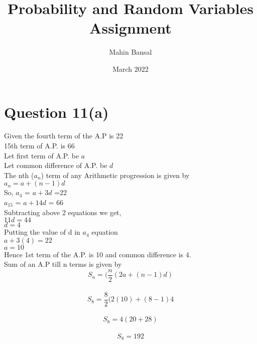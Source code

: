 \documentclass{article}
\title{Probability and Random Variables Assignment}
\author{Mahin Bansal }
\date{March 2022}
\begin{document}
\maketitle

\section{Question 11(a)}
Given the fourth term of the A.P is 22\\
15th term of A.P. is 66\\
Let first term of A.P. be $a$\\
Let common difference of A.P. be $d$\\
The nth ($a_n$) term  of any Arithmetic progression is given by 
\\$a_n = a +(n-1)d$\\
So,
$a_4$ = $a+3d$ =22\\
$a_15$ = $a+14d$ = 66\\
Subtracting above 2 equations we get,\\
$11d = 44$\\
$d=4$\\
Putting the value of d in $a_4$ equation \\
$a + 3(4) = 22$\\
$a = 10$\\
Hence  1st term of the A.P. is 10 and common difference is 4.\\
Sum of an A.P till n terms is given by $$S_n = (\frac{n}{2}(2a+(n-1)d)$$\\
$$S_8 =\frac{8}{2}(2(10)+(8-1)4$$\\
$$S_8 = 4(20+28)$$\\
$$ S_8 = 192$$\\
\end{document}
